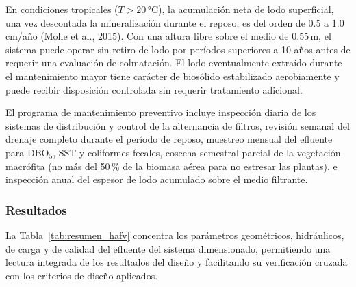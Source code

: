 \documentclass[12pt,a4paper]{article}
\begin{document}
En condiciones tropicales ($T > 20$\,°C), la acumulación neta de lodo superficial, una vez descontada la mineralización durante el reposo, es del orden de 0.5 a 1.0\,cm/año (Molle et al., 2015). Con una altura libre sobre el medio de 0.55\,m, el sistema puede operar sin retiro de lodo por períodos superiores a 10 años antes de requerir una evaluación de colmatación. El lodo eventualmente extraído durante el mantenimiento mayor tiene carácter de biosólido estabilizado aerobiamente y puede recibir disposición controlada sin requerir tratamiento adicional.

El programa de mantenimiento preventivo incluye inspección diaria de los sistemas de distribución y control de la alternancia de filtros, revisión semanal del drenaje completo durante el período de reposo, muestreo mensual del efluente para DBO$_5$, SST y coliformes fecales, cosecha semestral parcial de la vegetación macrófita (no más del 50\,\% de la biomasa aérea para no estresar las plantas), e inspección anual del espesor de lodo acumulado sobre el medio filtrante.


\subsubsection{Resultados}

La Tabla~\ref{tab:resumen_hafv} concentra los parámetros geométricos, hidráulicos, de carga y de calidad del efluente del sistema dimensionado, permitiendo una lectura integrada de los resultados del diseño y facilitando su verificación cruzada con los criterios de diseño aplicados.
\end{document}
